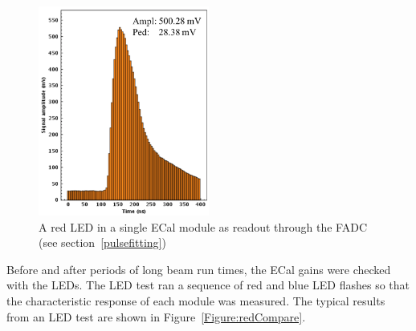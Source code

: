 \begin{figure}[htb]
  \centering
      \includegraphics[width=0.5\textwidth]{pics/experiment/ledSignal.png}
  \caption[LED signal in ECal FADC]{A red LED in a single ECal module as readout through the FADC (see section~\ref{pulsefitting})}
  \label{Figure:redSignal}
\end{figure}
Before and after periods of long beam run times, the ECal gains were checked with the LEDs. The LED test ran a sequence of red and blue LED flashes so that the characteristic response of each module was measured. The typical results from an LED test are shown in Figure~\ref{Figure:redCompare}.

